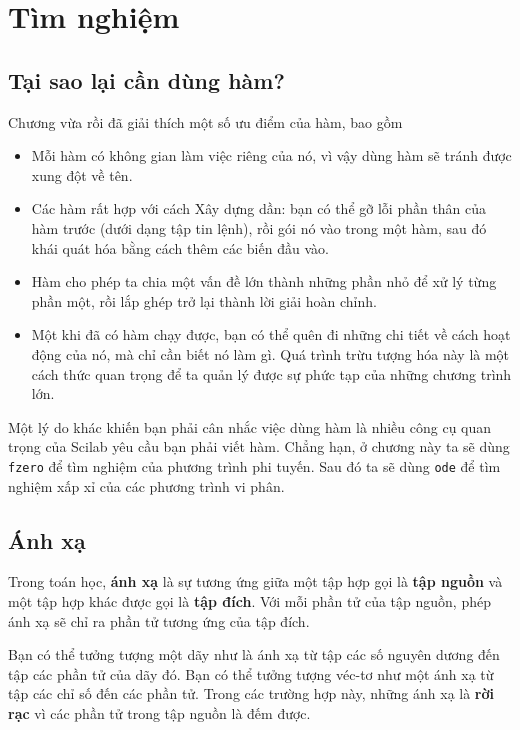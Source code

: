 \documentclass[12pt]{book}
\begin{document}
\chapter{Tìm nghiệm}


\section{Tại sao lại cần dùng hàm?}

Chương vừa rồi đã giải thích một số ưu điểm của hàm, bao gồm

\begin{itemize}

\item Mỗi hàm có không gian làm việc riêng của nó, vì vậy dùng hàm 
sẽ tránh được xung đột về tên.

\item Các hàm rất hợp với cách Xây dựng dần: bạn có thể gỡ lỗi
phần thân của hàm trước (dưới dạng tập tin lệnh), rồi gói nó vào
trong một hàm, sau đó khái quát hóa bằng cách thêm các biến đầu vào.

\item Hàm cho phép ta chia một vấn đề lớn thành những phần nhỏ
để xử lý từng phần một, rồi lắp ghép trở lại thành lời giải hoàn chỉnh.

\item Một khi đã có hàm chạy được, bạn có thể quên đi những chi tiết
về cách hoạt động của nó, mà chỉ cần biết nó làm gì. Quá trình trừu tượng hóa
này là một cách thức quan trọng để ta quản lý được sự phức tạp của
những chương trình lớn.

\end{itemize}

Một lý do khác khiến bạn phải cân nhắc việc dùng hàm là nhiều công cụ
quan trọng của Scilab yêu cầu bạn phải viết hàm. Chẳng hạn, ở 
chương này ta sẽ dùng {\tt fzero} để tìm nghiệm của phương trình
phi tuyến. Sau đó ta sẽ dùng {\tt ode} để tìm nghiệm xấp xỉ của
các phương trình vi phân.


\section{Ánh xạ}
\label{map}

Trong toán học, {\bf ánh xạ} là sự tương ứng giữa một tập hợp
gọi là {\bf tập nguồn} và một tập hợp khác được gọi là
{\bf tập đích}. Với mỗi phần tử của tập nguồn, phép ánh xạ sẽ
chỉ ra phần tử tương ứng của tập đích.

Bạn có thể tưởng tượng một dãy như là ánh xạ từ tập các số nguyên dương
đến tập các phần tử của dãy đó. Bạn có thể tưởng tượng véc-tơ như một
ánh xạ từ tập các chỉ số đến các phần tử. Trong các trường hợp này,
những ánh xạ là {\bf rời rạc} vì các phần tử trong tập nguồn là đếm được.
\end{document}
